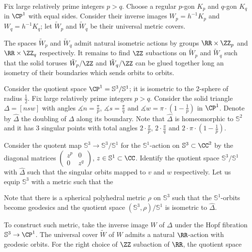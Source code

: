Fix large relatively prime integers $p>q$.
Choose a regular $p$-gon $K_p$ and $q$-gon $K_q$ in $\CP^1$ with equal sides.
Consider their inverse images $W_p=h^{-1}K_p$ and $W_q=h^{-1}K_q$;
let $\tilde W_p$ and $\tilde W_q$ be their universal metric covers.

The spaces $\tilde W_p$ and $\tilde W_q$ admit natural isometric actions by groups $\RR\times\ZZ_p$ and $\RR\times\ZZ_q$ respectively.
It remains to find $\ZZ$ subactions on $\tilde W_p$ and $\tilde W_q$ such that the solid toruses $\tilde W_p/\ZZ$ and $\tilde W_q/\ZZ$ can be glued together long an isometry of their boundaries which sends orbits to orbits.

Consider the quotient space $\CP^1=\mathbb S^3/\mathbb S^1$;
it is isometric to the 2-sphere of radius $\tfrac12$.
Fix large relatively prime integers $p>q$. 
Consider the solid triangle $\Delta=[nsw]$ with angles $\measuredangle n=\tfrac\pi p$, $\measuredangle s=\tfrac\pi q$ and $\measuredangle w=\pi\cdot(1-\tfrac1 p)$ in $\CP^1$.
Denote by $\hat \Delta$ the  doubling of $\Delta$ along  its boundary.
Note that $\hat \Delta$ is homeomorphic to $\mathbb S^2$ and
it has 3 singular points with total angles $2\cdot\tfrac\pi p$,
$2\cdot\tfrac\pi q$ and $2\cdot\pi\cdot(1-\tfrac1 p)$.

Consider the quotent map  $\mathbb S^3\to \mathbb S^3/\mathbb S^1$ for the $\mathbb S^1$-action on $\mathbb{S}^3\subset\CC^2$ by the diagonal matrices $\left(\begin{smallmatrix}z^p&0\\0&z^q\end{smallmatrix}\right)$, $z\in\mathbb S^1\subset\CC$.
Identify the quotient space $\mathbb S^3/\mathbb S^1$ with $\hat \Delta$ such that the singular orbits mapped to $v$ and $w$ respectively.
Let us equip $\mathbb S^3$ with a metric such that the 

Note that there is a spherical polyhedral metric $\rho$ on  $\mathbb S^3$
such that the $\mathbb S^1$-orbits become geodesics 
and the quotient space $(\mathbb S^3,\rho)/\mathbb S^1$
is isometric to $\hat \Delta$.

To construct such metric, take the inverse image $W$ of $\Delta$ under the Hopf fibration $\mathbb S^3 \to \CP^1$.
The universal cover $\tilde W$  of $W$ admits a natural $\RR$-action with geodesic orbits.
For the right choice of $\ZZ$ subaction of $\RR$,
the quotient space 
















